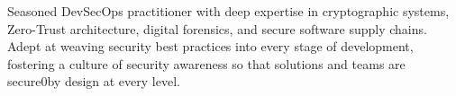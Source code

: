 \begin{cvparagraph}

Seasoned DevSecOps practitioner with deep expertise in cryptographic systems, Zero-Trust architecture, digital
forensics, and secure software supply chains. Adept at weaving security best practices into every stage of
development, fostering a culture of security awareness so that solutions and teams are secure0by design at every
level.

\end{cvparagraph}
